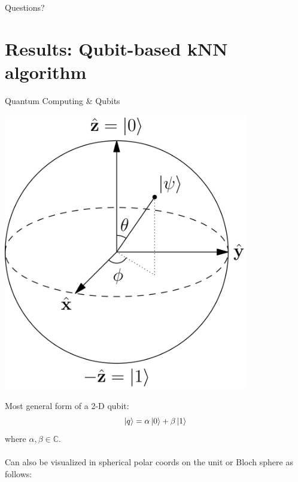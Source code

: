 \documentclass[10pt]{beamer}
\begin{document}
\begin{frame}[standout]
  Questions?
\end{frame}

\section{Results: Qubit-based kNN algorithm}

{
\begin{frame}[fragile]{}




\end{frame}
}

\appendix
{
\begin{frame}[fragile]{Quantum Computing \& Qubits}

\begin{minipage}[c]{.5\textwidth}
		\hspace{2mm}
       \includegraphics[width=0.8\textwidth]{blochsphere.png}
       \captionsetup{justification=raggedright, singlelinecheck=false}
\end{minipage}%
\begin{minipage}[c][][b]{.5\textwidth}
Most general form of a 2-D qubit:
\begin{equation}
\label{equ: blochqubit}
\ket{q} = \alpha \ket{0} + \beta \ket{1}
\end{equation}
where $\alpha,\beta \in \mathbb{C}$.\\
\\
Can also be visualized in spherical polar coords on the unit or Bloch sphere as follows: 


\end{minipage}
\end{frame}}
\end{document}
